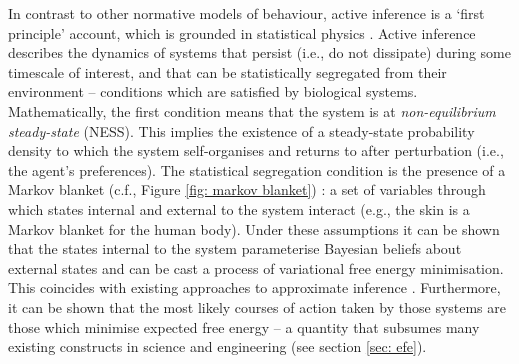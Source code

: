 \documentclass[review,12pt,authoryear]{elsarticle}
\begin{document}
In contrast to other normative models of behaviour, active inference is a ‘first principle’ account, which is grounded in statistical physics \citep{parrMarkovBlanketsInformation2019,fristonFreeEnergyPrinciple2019}. Active inference describes the dynamics of systems that persist (i.e., do not dissipate) during some timescale of interest, and that can be statistically segregated from their environment -- conditions which are satisfied by biological systems. Mathematically, the first condition means that the system is at \textit{non-equilibrium steady-state} (NESS). This implies the existence of a steady-state probability density to which the system self-organises and returns to after perturbation (i.e., the agent's preferences). The statistical segregation condition is the presence of a Markov blanket (c.f., Figure \ref{fig: markov blanket}) \citep{kirchhoffMarkovBlanketsLife2018,pearlGraphicalModelsProbabilistic1998}: a set of variables through which states internal and external to the system interact (e.g., the skin is a Markov blanket for the human body). Under these assumptions it can be shown that the states internal to the system parameterise Bayesian beliefs about external states and can be cast a process of variational free energy minimisation. This coincides with existing approaches to approximate inference \citep{bishopPatternRecognitionMachine2006,bealVariationalAlgorithmsApproximate2003,bleiVariationalInferenceReview2017,jordanIntroductionVariationalMethods1998}. Furthermore, it can be shown that the most likely courses of action taken by those systems are those which minimise expected free energy -- a quantity that subsumes many existing constructs in science and engineering (see section \ref{sec: efe}).
\end{document}
